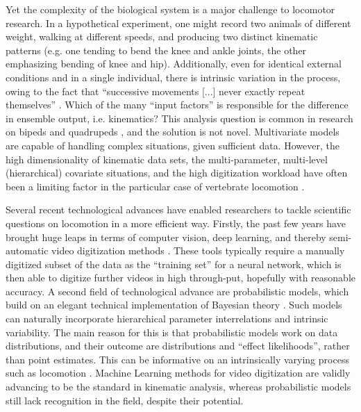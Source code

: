 Yet the complexity of the biological system is a major challenge to locomotor research.
In a hypothetical experiment, one might record two animals of different weight, walking at different speeds, and producing two distinct kinematic patterns (e.g. one tending to bend the knee and ankle joints, the other emphasizing bending of knee and hip).
Additionally, even for identical external conditions and in a single individual, there is intrinsic variation in the process, owing to the fact that ``successive movements [...] never exactly repeat themselves'' \citep{Bernstein1935}.
Which of the many ``input factors'' is responsible for the difference in ensemble output, i.e. kinematics?
This analysis question is common in research on bipeds \citep[e.g.][]{Ganley2005,StifflerJoachim2020,Bruton2013} and quadrupeds \citep[e.g.][]{Irschick1999,Pike2002,Stavrakakis2014}, and the solution is not novel.
Multivariate models are capable of handling complex situations, given sufficient data.
However, the high dimensionality of kinematic data sets, the multi-parameter, multi-level (hierarchical) covariate situations, and the high digitization workload have often been a limiting factor in the particular case of vertebrate locomotion \citep{Seethapathi2019,Michelini2020,Jackson2016}.


Several recent technological advances have enabled researchers to tackle scientific questions on locomotion in a more efficient way.
Firstly, the past few years have brought huge leaps in terms of computer vision, deep learning, and thereby semi-automatic video digitization methods \citep[][; cf. Ch. \ref{cpt:digitization}]{Karashchuk2021,Mathis2020,Jackson2016,Corcoran2021,MMielke2020}.
These tools typically require a manually digitized subset of the data as the ``training set'' for a neural network, which is then able to digitize further videos in high through-put, hopefully with reasonable accuracy.
A second field of technological advance are probabilistic models, which build on an elegant technical implementation of Bayesian theory \citep[Markov Chain Monte Carlo / MCMC sampling, \textit{cf.}][]{McElreath2018,Gelman2013,vandeSchoot2021}.
Such models can naturally incorporate hierarchical parameter interrelations and intrinsic variability.
The main reason for this is that probabilistic models work on data distributions, and their outcome are distributions and ``effect likelihoods'', rather than point estimates.
This can be informative on an intrinsically varying process such as locomotion \citep{Mielke2018,DeGroote2021}.
Machine Learning methods for video digitization are validly advancing to be the standard in kinematic analysis, whereas probabilistic models still lack recognition in the field, despite their potential.



